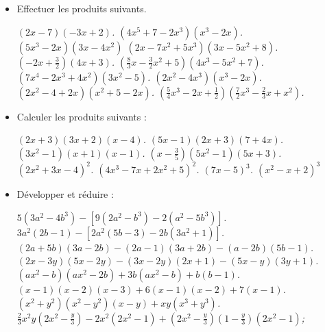 \begin{itemize}
\begin{enumerate}
\end{enumerate}
\it Soit l'expression littérale $A= x^2-3x+2$. \begin{enumerate}
\item Calculer le carré, puis le cube de $A$. 
\item Vérifier pour $x=-4$, les valeurs de $A$, $A^2$ et $A^3$. 
\end{enumerate}
\item Effectuer les produits suivants.
\begin{itemize}
\it $(2x-7)(-3x+2)$.
\it $(4x^5+7-2x^3)(x^3-2x)$.
\it $(5x^3-2x)(3x-4x^2)$
\it $(2x-7x^2+5x^3)(3x-5x^2+8)$.
\it $\left(-2x+\frac32\right)(4x+3)$.
\it $\left(\frac83x-\frac32x^2+5\right)(4x^3-5x^2+7)$.
\it $(7x^4-2x^3+4x^2)(3x^2-5)$.
\it $(2x^2-4x^3)(x^3-2x)$.
\it $(2x^2-4+2x)(x^2+5-2x)$.
\it $\left(\frac54x^3-2x+\frac12\right)\left(\frac72x^3-\frac23x+x^2\right)$.
\end{itemize}
\item Calculer les produits suivants : 
\begin{itemize}
\it $(2x+3)(3x+2)(x-4)$.
\it $(5x-1)(2x+3)(7+4x)$.
\it $(3x^2-1)(x+1)(x-1)$. 
\it $\left(x-\frac35\right)(5x^2-1)(5x+3)$.
\it $(2x^2+3x-4)^2$. 
\it $(4x^3-7x+2x^2+5)^2$. 
\it $(7x-5)^3$. 
\it $(x^2-x+2)^3$
\end{itemize}
\item Développer et réduire : 
\begin{itemize}
\it $5(3a^2-4b^3)-[9(2a^2-b^3)-2(a^2-5b^3)]$.
\it $3a^2(2b-1)-[2a^2(5b-3)-2b(3a^2+1)]$.
\it $(2a+5b)(3a-2b)-(2a-1)(3a+2b)-(a-2b)(5b-1)$.
\it $(2x-3y)(5x-2y)-(3x-2y)(2x+1)-(5x-y)(3y+1)$.
\it $(ax^2-b)(ax^2-2b)+3b(ax^2-b)+b(b-1)$.
\it $(x-1)(x-2)(x-3)+6(x-1)(x-2)+7(x-1)$.
\it $(x^2+y^2)(x^2-y^2)(x-y)+xy(x^3+y^3)$.
\it $\frac23x^2y\left(2x^2-\frac{y}3\right)-2x^2(2x^2-1)+\left(2x^2-\frac{y}3\right)\left(1-\frac{y}3\right)(2x^2-1)$;
\end{itemize}
\end{itemize}